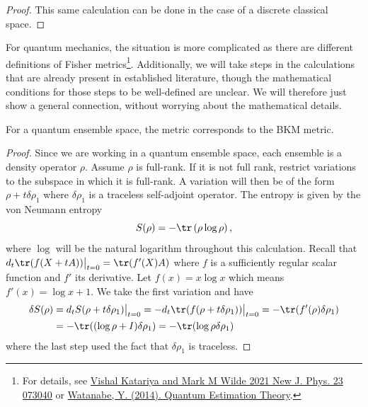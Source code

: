 \begin{mathSection}
\begin{proof}
	This same calculation can be done in the case of a discrete classical space.
\end{proof}

\begin{remark}
	For quantum mechanics, the situation is more complicated as there are different definitions of Fisher metrics\footnote{For details, see \href{https://iopscience.iop.org/article/10.1088/1367-2630/ac1186}{Vishal Katariya and Mark M Wilde 2021 New J. Phys. 23 073040} or \href{https://link.springer.com/chapter/10.1007/978-4-431-54493-7_4}{Watanabe, Y. (2014). Quantum Estimation Theory}.}. Additionally, we will take steps in the calculations that are already present in established literature, though the mathematical conditions for those steps to be well-defined are unclear. We will therefore just show a general connection, without worrying about the mathematical details.
	
\end{remark}

\begin{prop}
	For a quantum ensemble space, the metric corresponds to the BKM metric.
\end{prop}

\begin{proof}
	Since we are working in a quantum ensemble space, each ensemble is a density operator $\rho$. Assume $\rho$ is full-rank. If it is not full rank, restrict variations to the subspace in which it is full-rank. A variation will then be of the form $\rho + t \delta\rho_1$ where $\delta \rho_1$ is a traceless self-adjoint operator. The entropy is given by the von Neumann entropy
	\begin{equation}
		S(\rho) = - \tr\left(\rho \log \rho\right),
	\end{equation}
	where $\log$ will be the natural logarithm throughout this calculation. Recall that $d_t \tr(f(X+tA))\big|_{t=0} = \tr(f'(X)A)$ where $f$ is a sufficiently regular scalar function and $f'$ its derivative. Let $f(x) = x \log x$ which means $f'(x) = \log x + 1$. We take the first variation and have
	\begin{equation}
		\begin{aligned}
			\delta S(\rho) &= d_t S(\rho + t\delta\rho_1)\big|_{t=0} = - d_t \tr(f(\rho + t \delta \rho_1))\big|_{t=0} = -\tr(f'(\rho)\delta \rho_1) \\
			&= - \tr((\log \rho + I) \delta \rho_1) = - \tr(\log \rho \delta \rho_1)
		\end{aligned}
	\end{equation}
	where the last step used the fact that $\delta \rho_1$ is traceless.
	

\end{proof}
\end{mathSection}

